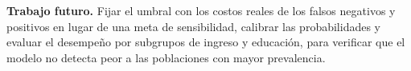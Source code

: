\documentclass[journal]{IEEEtran}
\begin{document}
\textbf{Trabajo futuro.} Fijar el umbral con los costos reales de los falsos negativos y positivos en lugar de una meta de sensibilidad, calibrar las probabilidades y evaluar el desempeño por subgrupos de ingreso y educación, para verificar que el modelo no detecta peor a las poblaciones con mayor prevalencia.



\end{document}

